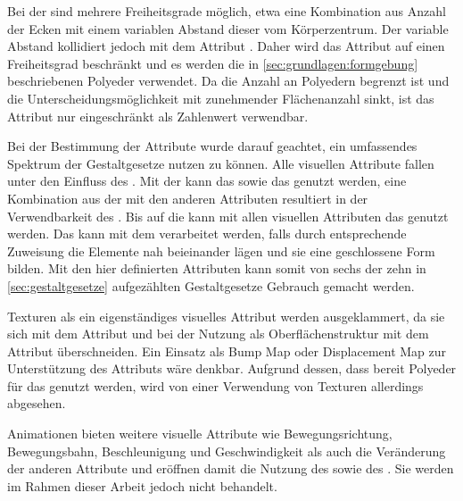 Bei der  sind mehrere Freiheitsgrade möglich, etwa eine Kombination aus Anzahl der Ecken mit einem variablen Abstand dieser vom Körperzentrum. Der variable Abstand kollidiert jedoch mit dem Attribut . Daher wird das Attribut  auf einen Freiheitsgrad beschränkt und es werden die in \autoref{sec:grundlagen:formgebung} beschriebenen Polyeder verwendet. Da die Anzahl an Polyedern begrenzt ist und die Unterscheidungsmöglichkeit mit zunehmender Flächenanzahl sinkt, ist das Attribut  nur eingeschränkt als Zahlenwert verwendbar.

Bei der Bestimmung der Attribute wurde darauf geachtet, ein umfassendes Spektrum der Gestaltgesetze nutzen zu können. Alle visuellen Attribute fallen unter den Einfluss des . Mit der  kann das  sowie das  genutzt werden, eine Kombination aus der  mit den anderen Attributen resultiert in der Verwendbarkeit des . Bis auf die  kann mit allen visuellen Attributen das  genutzt werden. Das  kann mit dem  verarbeitet werden, falls durch entsprechende Zuweisung die Elemente nah beieinander lägen und sie eine geschlossene Form bilden. Mit den hier definierten Attributen kann somit von sechs der zehn in \autoref{sec:gestaltgesetze} aufgezählten Gestaltgesetze Gebrauch gemacht werden.

Texturen als ein eigenständiges visuelles Attribut werden ausgeklammert, da sie sich mit dem Attribut  und bei der Nutzung als Oberflächenstruktur mit dem Attribut  überschneiden. Ein Einsatz als Bump Map oder Displacement Map zur Unterstützung des Attributs  wäre denkbar. Aufgrund dessen, dass bereit Polyeder für das  genutzt werden, wird von einer Verwendung von Texturen allerdings abgesehen.

Animationen bieten weitere visuelle Attribute wie Bewegungsrichtung, Bewegungsbahn, Beschleunigung und Geschwindigkeit als auch die Veränderung der anderen Attribute und eröffnen damit die Nutzung des  sowie des . Sie werden im Rahmen dieser Arbeit jedoch nicht behandelt.

